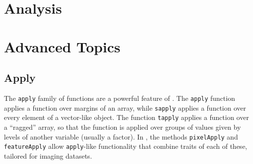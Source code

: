 \documentclass[a4paper]{article}
\begin{document}
\section{Analysis}


\section{Advanced Topics}

\subsection{Apply}
The \verb|apply| family of functions are a powerful feature of \R. The \verb|apply| function applies a function over margins of an array, while \verb|sapply| applies a function over every element of a vector-like object. The function \verb|tapply| applies a function over a ``ragged'' array, so that the function is applied over groups of values given by levels of another variable (usually a factor). In , the methods \verb|pixelApply| and \verb|featureApply| allow \verb|apply|-like functionality that combine traits of each of these, tailored for imaging datasets.
\end{document}
